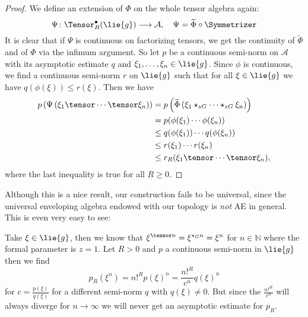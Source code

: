 \begin{proof}
    We define an extension of $\Phi$ on the whole tensor algebra
    again:
    \begin{equation*}
        \Psi \colon
        \Tensor_R^{\bullet}(\lie{g})
        \longrightarrow
        \mathcal{A},
        \quad
        \Psi
        =
        \widetilde{\Phi} \circ \Symmetrizer
    \end{equation*}
    It is clear that if $\Psi$ is continuous on factorizing tensors,
    we get the continuity of $\widetilde{\Phi}$ and of $\Phi$ via the
    infimum argument. So let $p$ be a continuous semi-norm on
    $\mathcal{A}$ with its asymptotic estimate $q$ and $\xi_1, \ldots,
    \xi_n \in \lie{g}$. Since $\phi$ is continuous, we find a
    continuous semi-norm $r$ on $\lie{g}$ such that for all $\xi \in
    \lie{g}$ we have $q(\phi(\xi)) \leq r(\xi)$. Then we have
    \begin{align*}
        p \left(
        \Psi \left(
        \xi_1 \tensor \cdots \tensor \xi_n
        \right) \right)
        & =
        p \left(
        \widetilde{\Phi} \left(
        \xi_1 \star_{zG} \cdots \star_{zG} \xi_n
        \right) \right)
        \\
        & =
        p( \phi(\xi_1) \cdots \phi(\xi_n) )
        \\
        & \leq
        q( \phi(\xi_1) )
        \cdots
        q( \phi(\xi_n) )
        \\
        & \leq
        r(\xi_1) \cdots r(\xi_n)
        \\
        & \leq
        r_R(\xi_1 \tensor \cdots \tensor \xi_n),
    \end{align*}
    where the last inequality is true for all $R \geq 0$.
\end{proof}


Although this is a nice result, our construction fails to be
universal, since the universal enveloping algebra endowed with our
topology is \emph{not} AE in general. This is even very easy to see:
\begin{example}
    Take $\xi \in \lie{g}$, then we know that $\xi^{\tensor n} =
    \xi^{\ostar_G n} = \xi^n$ for $n \in \mathbb{N}$ where the formal
    parameter is $z = 1$. Let $R > 0$ and $p$ a continuous semi-norm
    in $\lie{g}$ then we find
    \begin{equation}
        p_R(\xi^n)
        =
        n!^R p(\xi)^n
        =
        \frac{n!^R}{c^n} q(\xi)^n
    \end{equation}
    for $c = \frac{p(\xi)}{q(\xi)}$ for a different semi-norm $q$ with
    $q(\xi) \neq 0$.  But since the $\frac{n!^R}{c^n}$ will always
    diverge for $n \rightarrow \infty$ we will never get an asymptotic
    estimate for $p_R$.
\end{example}



